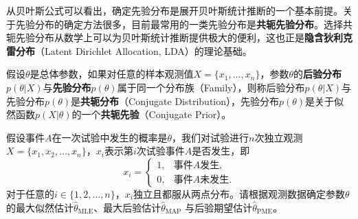 从贝叶斯公式可以看出，确定先验分布是展开贝叶斯统计推断的一个基本前提。关于先验分布的确定方法很多，目前最常用的一类先验分布是\textbf{共轭先验分布}。选择共轭先验分布从数学上可以为贝叶斯统计推断提供极大的便利，这也正是\textbf{隐含狄利克雷分布}（Latent Dirichlet Allocation, LDA）的理论基础。
\begin{definition}[共轭先验分布]
假设$\theta$是总体参数，如果对任意的样本观测值$X=\{x_1,\ldots,x_n\}$，参数$\theta$的\textbf{后验分布}$p(\theta|X)$与\textbf{先验分布}$p(\theta)$属于同一个分布族（Family），则称后验分布$p(\theta|X)$与先验分布$p(\theta)$是\textbf{共轭分布}（Conjugate Distribution），先验分布$p(\theta)$是关于似然函数$p(X|\theta)$的一个\textbf{共轭先验}（Conjugate Prior）。
\end{definition}

\begin{example}
假设事件$A$在一次试验中发生的概率是$\theta$，我们对试验进行$n$次独立观测$X=\{x_1,x_2,\ldots,x_n\}$，$x_i$表示第$i$次试验事件$A$是否发生，即
\[
    x_i = \left\{
    \begin{array}{rl}
        1, & \text{事件$A$发生},\\
        0, & \text{事件$A$未发生}.
    \end{array}
    \right.
\]
对于任意的$i\in\{1,2,\ldots,n\}$，$x_i$独立且都服从两点分布。请根据观测数据确定参数$\theta$的最大似然估计$\hat \theta_\mathrm{MLE}$、最大后验估计$\hat\theta_\mathrm{MAP}$ 与后验期望估计$\hat \theta_\mathrm{PME}$。
\end{example}
